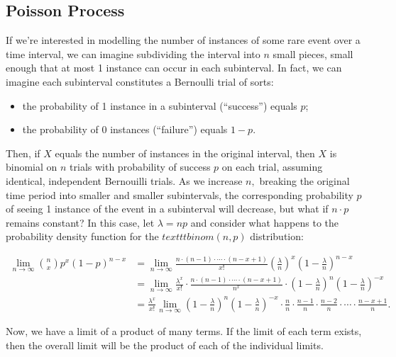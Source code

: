 \documentclass[
]{book}
\providecommand{\tightlist}{%
  \setlength{\itemsep}{0pt}\setlength{\parskip}{0pt}}
\theoremstyle{definition}
\theoremstyle{definition}
\theoremstyle{definition}
\theoremstyle{definition}
\theoremstyle{remark}
\begin{document}
\subsection{Poisson Process}\label{poisson-process}

If we're interested in modelling the number of instances of some rare event over a time interval, we can imagine subdividing the interval into \(n\) small pieces, small enough that at most 1 instance can occur in each subinterval. In fact, we can imagine each subinterval constitutes a Bernoulli trial of sorts:

\begin{itemize}
\tightlist
\item
  the probability of 1 instance in a subinterval (``success'') equals \(p\);
\item
  the probability of 0 instances (``failure'') equals \(1-p\).
\end{itemize}

Then, if \(X\) equals the number of instances in the original interval, then \(X\) is binomial on \(n\) trials with probability of success \(p\) on each trial, assuming identical, independent Bernouilli trials. As we increase \(n,\) breaking the original time period into smaller and smaller subintervals, the corresponding probability \(p\) of seeing 1 instance of the event in a subinterval will decrease, but what if \(n \cdot p\) remains constant? In this case, let \(\lambda = np\) and consider what happens to the probability density function for the \(texttt{binom}(n,p)\) distribution:

\begin{align*}
\lim_{n \to \infty} \binom{n}{x}p^x(1-p)^{n-x} &= \lim_{n \to \infty} \frac{n\cdot(n-1)\cdot \cdots \cdot (n - x + 1)}{x!} \left(\frac{\lambda}{n}\right)^x\left(1-\frac{\lambda}{n}\right)^{n-x} \\
  &=\lim_{n \to \infty} \frac{\lambda^x}{x!}\cdot\frac{n\cdot(n-1)\cdot \cdots \cdot (n - x + 1)}{n^x}\cdot\left(1-\frac{\lambda}{n}\right)^{n}\left(1-\frac{\lambda}{n}\right)^{-x}\\
  &=\frac{\lambda^x}{x!}\lim_{n \to \infty}\left(1-\frac{\lambda}{n}\right)^{n}\left(1-\frac{\lambda}{n}\right)^{-x} \cdot \frac{n}{n} \cdot \frac{n-1}{n} \cdot \frac{n-2}{n} \cdot \cdots \cdot \frac{n-x+1}{n}.
\end{align*}

Now, we have a limit of a product of many terms. If the limit of each term exists, then the overall limit will be the product of each of the individual limits.
\end{document}
